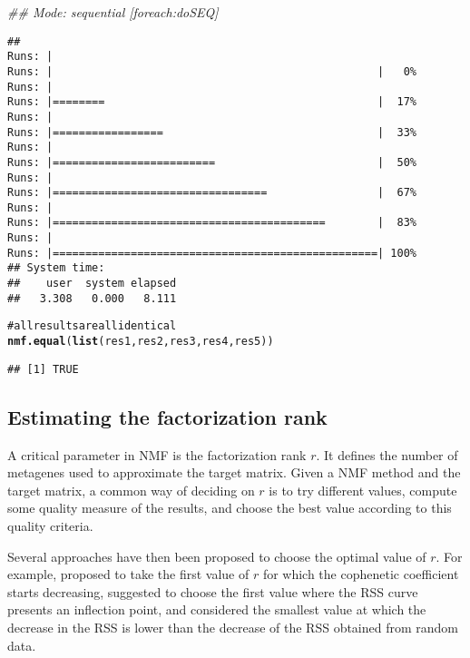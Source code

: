 \documentclass[a4paper]{article}\usepackage{graphicx, color}
\makeatletter
\newcommand{\hlfunctioncall}[1]{\textcolor[rgb]{0.501960784313725,0,0.329411764705882}{\textbf{#1}}}%
\newcommand{\hlcomment}[1]{\textcolor[rgb]{0.180392156862745,0.6,0.341176470588235}{#1}}%
\newenvironment{kframe}{%
 \def\at@end@of@kframe{}%
 \ifinner\ifhmode%
  \def\at@end@of@kframe{\end{minipage}}%
  \begin{minipage}{\columnwidth}%
 \fi\fi%
 \def\FrameCommand##1{\hskip\@totalleftmargin \hskip-\fboxsep
 \colorbox{shadecolor}{##1}\hskip-\fboxsep
     \hskip-\linewidth \hskip-\@totalleftmargin \hskip\columnwidth}%
 \MakeFramed {\advance\hsize-\width
   \@totalleftmargin\z@ \linewidth\hsize
   \@setminipage}}%
 {\par\unskip\endMakeFramed%
 \at@end@of@kframe}
\newenvironment{knitrout}{}{} %
\renewcommand{\cite}[1]{\parencite{#1}}
\makeatother
\begin{document}
\begin{knitrout}
\begin{kframe}
{\ttfamily\noindent\itshape\textcolor{messagecolor}{\#\# Mode: sequential [foreach:doSEQ]}}\begin{verbatim}
## 
Runs: |                                                        
Runs: |                                                  |   0%
Runs: |                                                        
Runs: |========                                          |  17%
Runs: |                                                        
Runs: |=================                                 |  33%
Runs: |                                                        
Runs: |=========================                         |  50%
Runs: |                                                        
Runs: |=================================                 |  67%
Runs: |                                                        
Runs: |==========================================        |  83%
Runs: |                                                        
Runs: |==================================================| 100%
## System time:
##    user  system elapsed 
##   3.308   0.000   8.111
\end{verbatim}
\begin{alltt}

\hlcomment{# all results are all identical}
\hlfunctioncall{nmf.equal}(\hlfunctioncall{list}(res1, res2, res3, res4, res5))
\end{alltt}
\begin{verbatim}
## [1] TRUE
\end{verbatim}
\end{kframe}
\end{knitrout}



\subsection{Estimating the factorization rank}
A critical parameter in NMF is the factorization rank $r$. 
It defines the number of metagenes used to approximate the target matrix.
Given a NMF method and the target matrix, a common way of deciding on $r$ is to try different values, compute some quality measure of the results, and choose the best value according to this quality criteria.

Several approaches have then been proposed to choose the optimal value of $r$.
For example, \cite{Brunet2004} proposed to take the first value of $r$ for which the cophenetic coefficient starts decreasing, \cite{Hutchins2008} suggested to choose the first value where the RSS curve presents an inflection point, and \cite{Frigyesi2008} considered the smallest value at which the decrease in the RSS is lower than the decrease of the RSS obtained from random data.
\end{document}
